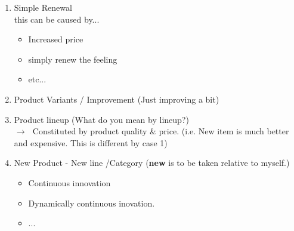 \documentclass[12pt]{article}
\newcommand{\ra}{$\rightarrow \text{ }$}
\begin{document}
\begin{enumerate}
	\item Simple Renewal \\
	this can be caused by...
	\begin{itemize}
		\item Increased price
		\item simply renew the feeling
		\item etc...
	\end{itemize}
	 \item Product Variants / Improvement (Just improving a bit)
	 \item Product lineup (What do you mean by lineup?) \\
	 \ra Constituted by product quality & price. (i.e. New item is much better and expensive. This is different by case 1)
	 \item New Product - New line /Category (\textbf{new} is to be taken relative to myself.) \\
	 \begin{itemize}
	 	\item Continuous innovation
		\item Dynamically continuous inovation.
		\item ...
	 \end{itemize}

\end{enumerate}
\end{document}
